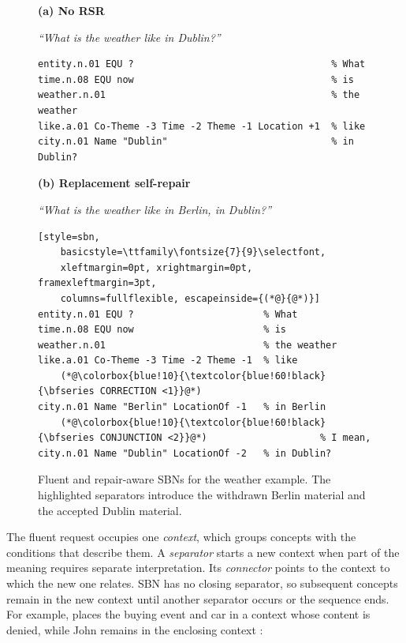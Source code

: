 \begin{figure}[H]
\centering
\begin{minipage}[t]{0.53\textwidth}
\raggedright
\textbf{(a) No RSR}\par\smallskip
\parbox[t][3\baselineskip][t]{\linewidth}{\small\raggedright
\textit{``What is the weather like in Dublin?''}}
\begin{lstlisting}[style=sbn,
    basicstyle=\ttfamily\fontsize{7}{9}\selectfont,
    xleftmargin=0pt, xrightmargin=0pt, framexleftmargin=3pt,
    columns=fullflexible]
entity.n.01 EQU ?                                   % What
time.n.08 EQU now                                   % is
weather.n.01                                        % the weather
like.a.01 Co-Theme -3 Time -2 Theme -1 Location +1  % like 
city.n.01 Name "Dublin"                             % in Dublin?
\end{lstlisting}
\end{minipage}\hfill
\begin{minipage}[t]{0.42\textwidth}
\raggedright
\textbf{(b) Replacement self-repair}\par\smallskip
\parbox[t][3\baselineskip][t]{\linewidth}{\small\raggedright
\textit{``What is the weather like in Berlin, in Dublin?''}}
\begin{lstlisting}[style=sbn,
    basicstyle=\ttfamily\fontsize{7}{9}\selectfont,
    xleftmargin=0pt, xrightmargin=0pt, framexleftmargin=3pt,
    columns=fullflexible, escapeinside={(*@}{@*)}]
entity.n.01 EQU ?                       % What
time.n.08 EQU now                       % is
weather.n.01                            % the weather
like.a.01 Co-Theme -3 Time -2 Theme -1  % like 
    (*@\colorbox{blue!10}{\textcolor{blue!60!black}{\bfseries CORRECTION <1}}@*)
city.n.01 Name "Berlin" LocationOf -1   % in Berlin
    (*@\colorbox{blue!10}{\textcolor{blue!60!black}{\bfseries CONJUNCTION <2}}@*)                    % I mean, 
city.n.01 Name "Dublin" LocationOf -2   % in Dublin?
\end{lstlisting}
\end{minipage}
\caption{Fluent and repair-aware SBNs for the weather example. The highlighted
separators introduce the withdrawn Berlin material and the accepted Dublin
material.}
\label{fig:weather-rsr-comparison}
\end{figure}

The fluent request occupies one \emph{context}, which groups concepts with the
conditions that describe them. A \emph{separator} starts a new context when
part of the meaning requires separate interpretation. Its \emph{connector}
points to the context to which the new one relates. SBN has no closing
separator, so subsequent concepts remain in the new context until another
separator occurs or the sequence ends. For example,  places
the buying event and car in a context whose content is denied, while John
remains in the enclosing context
\citep{bosVariablefreeDiscourseRepresentation2021}:

